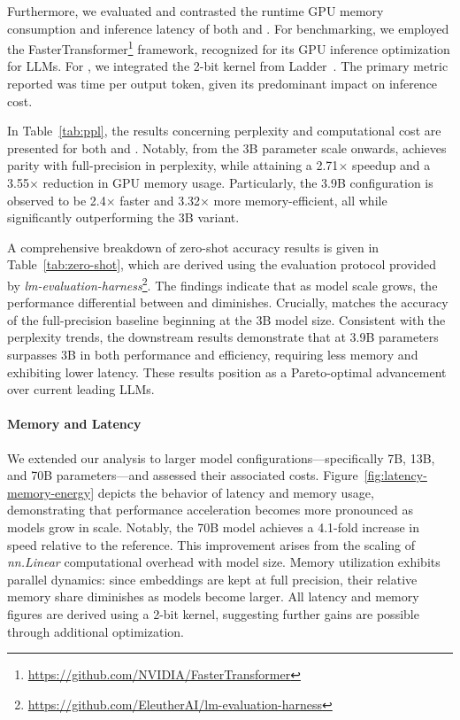 Furthermore, we evaluated and contrasted the runtime GPU memory consumption and inference latency of both  and . For benchmarking, we employed the FasterTransformer\footnote{\url{https://github.com/NVIDIA/FasterTransformer}} framework, recognized for its GPU inference optimization for LLMs. For , we integrated the 2-bit kernel from Ladder~\cite{ladder}. The primary metric reported was time per output token, given its predominant impact on inference cost.

In Table~\ref{tab:ppl}, the results concerning perplexity and computational cost are presented for both  and . Notably, from the 3B parameter scale onwards,  achieves parity with full-precision  in perplexity, while attaining a 2.71$\times$ speedup and a 3.55$\times$ reduction in GPU memory usage. Particularly, the 3.9B  configuration is observed to be 2.4$\times$ faster and 3.32$\times$ more memory-efficient, all while significantly outperforming the 3B  variant.

A comprehensive breakdown of zero-shot accuracy results is given in Table~\ref{tab:zero-shot}, which are derived using the evaluation protocol provided by \emph{lm-evaluation-harness}\footnote{\url{https://github.com/EleutherAI/lm-evaluation-harness}}. The findings indicate that as model scale grows, the performance differential between  and  diminishes. Crucially,  matches the accuracy of the full-precision baseline beginning at the 3B model size. Consistent with the perplexity trends, the downstream results demonstrate that  at 3.9B parameters surpasses  3B in both performance and efficiency, requiring less memory and exhibiting lower latency. These results position  as a Pareto-optimal advancement over current leading LLMs.

\paragraph{Memory and Latency}

We extended our analysis to larger model configurations—specifically 7B, 13B, and 70B parameters—and assessed their associated costs. Figure~\ref{fig:latency-memory-energy} depicts the behavior of latency and memory usage, demonstrating that performance acceleration becomes more pronounced as models grow in scale. Notably, the  70B model achieves a 4.1-fold increase in speed relative to the  reference. This improvement arises from the scaling of \emph{nn.Linear} computational overhead with model size. Memory utilization exhibits parallel dynamics: since embeddings are kept at full precision, their relative memory share diminishes as models become larger. All latency and memory figures are derived using a 2-bit kernel, suggesting further gains are possible through additional optimization.

